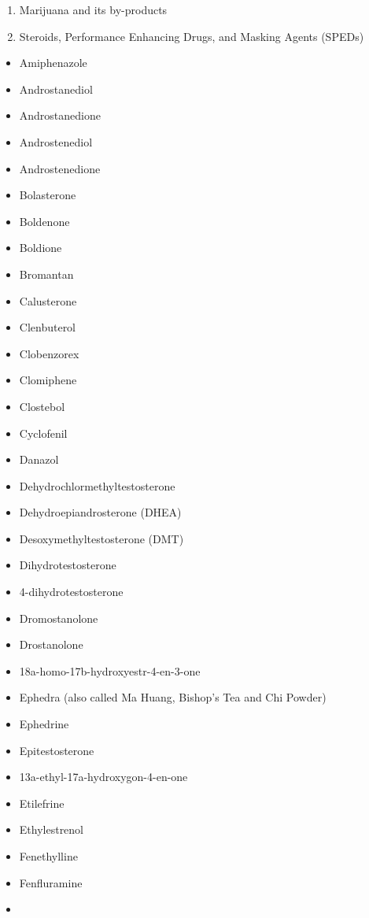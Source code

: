 \documentclass[
]{book}
\providecommand{\tightlist}{%
  \setlength{\itemsep}{0pt}\setlength{\parskip}{0pt}}
\begin{document}
\begin{enumerate}
\def\labelenumi{(\alph{enumi})}
\setcounter{enumi}{1}
\item
  Marijuana and its by-products
\item
  Steroids, Performance Enhancing Drugs, and Masking Agents (SPEDs)
\end{enumerate}

\begin{itemize}
\tightlist
\item
  Amiphenazole
\item
  Androstanediol
\item
  Androstanedione
\item
  Androstenediol
\item
  Androstenedione
\item
  Bolasterone
\item
  Boldenone
\item
  Boldione
\item
  Bromantan
\item
  Calusterone
\item
  Clenbuterol
\item
  Clobenzorex
\item
  Clomiphene
\item
  Clostebol
\item
  Cyclofenil
\item
  Danazol
\item
  Dehydrochlormethyltestosterone
\item
  Dehydroepiandrosterone (DHEA)
\item
  Desoxymethyltestosterone (DMT)
\item
  Dihydrotestosterone
\item
  4-dihydrotestosterone
\item
  Dromostanolone
\item
  Drostanolone
\item
  18a-homo-17b-hydroxyestr-4-en-3-one
\item
  Ephedra (also called Ma Huang, Bishop's Tea and Chi Powder)
\item
  Ephedrine
\item
  Epitestosterone
\item
  13a-ethyl-17a-hydroxygon-4-en-one
\item
  Etilefrine
\item
  Ethylestrenol
\item
  Fenethylline
\item
  Fenfluramine
\item

\end{itemize}
\end{document}
